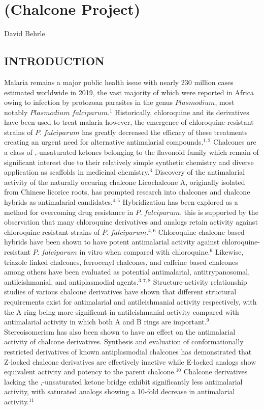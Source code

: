\documentclass[12pt]{article}
\begin{document}
\linespread{1.25}
\raggedright
\setlength{\parskip}{6pt}

\section*{(Chalcone Project)}

David Behrle

\subsection*{INTRODUCTION}
Malaria remains a major public health issue with nearly 230 million cases estimated worldwide in 2019, the vast majority of which were reported in Africa owing to infection by protozoan parasites in the genus $Plasmodium$, most notably $Plasmodium\; falciparum$.$^1$ Historically, chloroquine and its derivatives have been used to treat malaria however, the emergence of chloroquine-resistant strains of $P.\; falciparum$ has greatly decreased the efficacy of these treatments creating an urgent need for alternative antimalarial compounds.$^{1,2}$ Chalcones are a class of \textalpha,\textbeta-unsaturated ketones belonging to the flavonoid family which remain of significant interest due to their relatively simple synthetic chemistry and diverse application as scaffolds in medicinal chemistry.$^3$ Discovery of the antimalarial activity of the naturally occuring chalcone Licochalcone A, originally isolated from Chinese licorice roots, has prompted research into chalcones and chalcone hybrids as antimalarial candidates.$^{4,5}$ Hybridization has been explored as a method for overcoming drug resistance in $P.\; falciparum$, this is supported by the observation that many chloroquine derivatives and analogs retain activity against chloroquine-resistant strains of $P.\; falciparum$.$^{4,6}$ Chloroquine-chalcone based hybrids have been shown to have potent antimalarial activity against chloroquine-resistant $P.\; falciparum$ in vitro when compared with chloroquine.$^6$ Likewise, triazole linked chalcones, ferrocenyl chalcones, and caffeine based chalcones among others have been evaluated as potential antimalarial, antitrypanosomal, antileishmanial, and antiplasmodial agents.$^{3,7,8}$ Structure-activity relationship studies of various chalcone derivatives have shown that different structural requirements exist for antimalarial and antileishmanial activity respectively, with the A ring being more significant in antileishmanial activity compared with antimalarial activity in which both A and B rings are important.$^9$ Stereoisomerism has also been shown to have an effect on the antimalarial activity of chalcone derivatives. Synthesis and evaluation of conformationally restricted derivatives of known antiplasmodial chalcones has demonstrated that Z-locked chalcone derivatives are effectively inactive while E-locked analogs show equivalent activity and potency to the parent chalcone.$^{10}$ Chalcone derivatives lacking the \textalpha,\textbeta-unsaturated ketone bridge exhibit significantly less antimalarial activity, with saturated analogs showing a 10-fold decrease in antimalarial activity.$^{11}$
\end{document}

